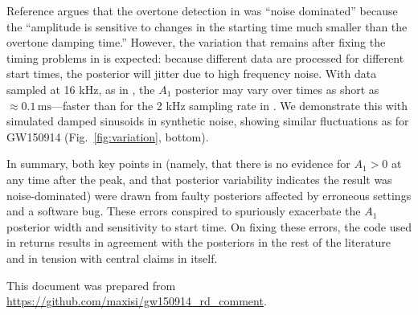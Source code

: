 \documentclass[aps,prd,twocolumn,superscriptaddress,preprintnumbers,floatfix,nofootinbib]{revtex4-2}
\begin{document}
Reference \cite{Cotesta:2022pci} argues that the overtone detection in \cite{Isi:2019aib} was ``noise dominated'' because the ``amplitude is sensitive to changes in the starting time much smaller than the overtone damping time.''
However, the variation that remains after fixing the timing problems in \cite{Cotesta:2022pci} is expected: because different data are processed for different start times, the posterior will jitter due to high frequency noise.
With data sampled at 16 kHz, as in \cite{Cotesta:2022pci}, the $A_1$ posterior may vary over times as short as $\approx 0.1\, \mathrm{ms}$---faster than for the 2 kHz sampling rate in \cite{Isi:2019aib,Isi:2022mhy}.
We demonstrate this with simulated damped sinusoids in synthetic noise, showing similar fluctuations as for GW150914 (Fig.~\ref{fig:variation}, bottom).

In summary, both key points in \cite{Cotesta:2022pci} (namely, that there is no evidence for $A_1 > 0$ at any time after the peak, and that posterior variability indicates the result was noise-dominated) were drawn from faulty posteriors affected by erroneous settings and a software bug.
These errors conspired to spuriously exacerbate the $A_1$ posterior width and sensitivity to start time.
On fixing these errors, the code used in \cite{Cotesta:2022pci} returns results in agreement with the posteriors in the rest of the literature and in tension with central claims in \cite{Cotesta:2022pci} itself.

This document was prepared from \url{https://github.com/maxisi/gw150914_rd_comment}.


\end{document}
